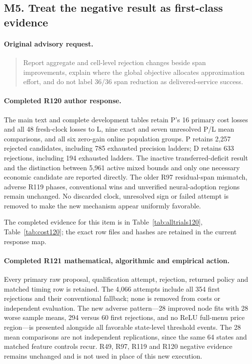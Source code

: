 \subsection{M5. Treat the negative result as first-class evidence}
\label{response122:M5}

\paragraph{Original advisory request.}
\begin{quote}
Report aggregate and cell-level rejection changes beside span improvements, explain where the global objective allocates approximation effort, and do not label 36/36 span reduction as delivered-service success.
\end{quote}

\paragraph{Completed R120 author response.}
The main text and complete development tables retain P's 16 primary cost losses and all 48 fresh-clock losses to L, nine exact and seven unresolved P/L mean comparisons, and all six zero-gain online population groups. P retains 2,257 rejected candidates, including 785 exhausted precision ladders; D retains 633 rejections, including 194 exhausted ladders. The inactive transferred-deficit result and the distinction between 5,961 active mixed bounds and only one necessary economic candidate are reported directly. The older R97 residual-span mismatch, adverse R119 phases, conventional wins and unverified neural-adoption regions remain unchanged. No discarded clock, unresolved sign or failed attempt is removed to make the new mechanism appear uniformly favorable.

The completed evidence for this item is in Table~\ref{tab:alltrials120}, Table~\ref{tab:cost120}; the exact row files and hashes are retained in the current response map.

\paragraph{Completed R121 mathematical, algorithmic and empirical action.}
Every primary raw proposal, qualification attempt, rejection, returned policy and matched timing row is retained. The 4,066 attempts include all 354 first rejections and their conventional fallback; none is removed from costs or independent evaluation. The new adverse pattern---28 improved node fits with 28 worse sample means, 294 versus 60 first rejections, and no ReLU full-menu price region---is presented alongside all favorable state-level threshold events. The 28 mean comparisons are not independent replications, since the same 64 states and matched feature controls recur. R49, R97, R119 and R120 negative evidence remains unchanged and is not used in place of this new execution.


